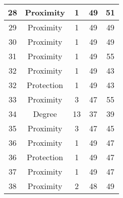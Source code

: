 \documentclass[results.tex]{subfiles}
\begin{document}
\begin{center}
\begin{tabular}{| c || c | c | c | c |}
            \hline
            28                      & Proximity                    & 1                      & 49                      & 51                   \\
            \hline
            29                      & Proximity                    & 1                      & 49                      & 49                   \\
            \hline
            30                      & Proximity                    & 1                      & 49                      & 49                   \\
            \hline
            31                      & Proximity                    & 1                      & 49                      & 55                   \\
            \hline
            32                      & Proximity                    & 1                      & 49                      & 43                   \\
            \hline
            32                      & Protection                   & 1                      & 49                      & 43                   \\
            \hline
            33                      & Proximity                    & 3                      & 47                      & 55                   \\
            \hline
            34                      & Degree                       & 13                     & 37                      & 39                   \\
            \hline
            35                      & Proximity                    & 3                      & 47                      & 45                   \\
            \hline
            36                      & Proximity                    & 1                      & 49                      & 47                   \\
            \hline
            36                      & Protection                   & 1                      & 49                      & 47                   \\
            \hline
            37                      & Proximity                    & 1                      & 49                      & 47                   \\
            \hline
            38                      & Proximity                    & 2                      & 48                      & 49                   \\

\end{tabular}
\end{center}
\end{document}
